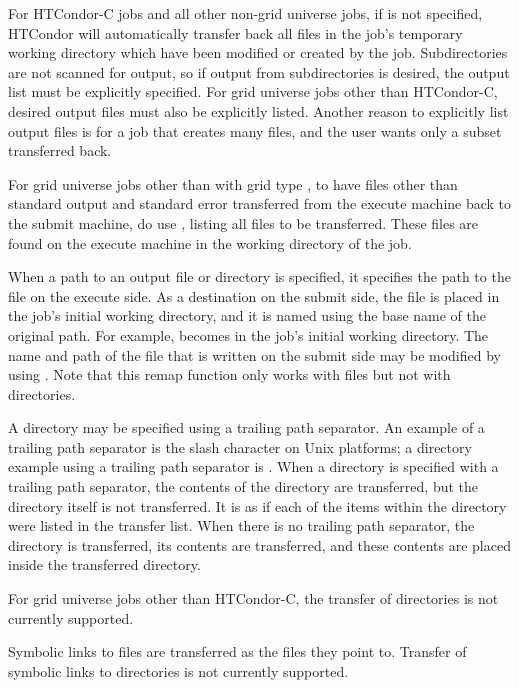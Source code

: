\begin{description}
For HTCondor-C jobs and all other non-grid universe jobs,
if  is not specified,
HTCondor will automatically transfer back all files in the job's
temporary working directory which have been
modified or created by the job.  Subdirectories are not scanned for
output, so if output from subdirectories is desired, the output list
must be explicitly specified.
For grid universe jobs other than HTCondor-C, desired output files must
also be explicitly listed.
Another reason to explicitly list output files is for a job that creates
many files, and the user wants only a subset transferred back.

For grid universe jobs other than with grid type ,
to have files other than standard output and standard error transferred
from the execute machine back to the submit machine,
do use , listing
all files to be transferred.
These files are found on the execute machine in the
working directory of the job.

When a path to an output file or directory is specified,
it specifies the path to the file on the execute side.
As a destination on the submit side,
the file is placed in the job's initial working directory,
and it is named using the base name of the original path.
For example,  becomes  in
the job's initial working directory.
The name and path of the file
that is written on the submit side may be modified by
using . Note that this remap
function only works with files but not with directories. 

A directory may be specified using a trailing path separator.
An example of a trailing path separator is the slash character on Unix
platforms; a directory example using a trailing path separator
is . 
When a directory is specified with a trailing path separator,
the contents of the directory are
transferred,  but the directory itself is not transferred.
It is as if each of the items
within the directory were listed in the transfer list.
When there is no trailing path separator,
the directory is transferred, its contents are transferred,
and these contents are placed inside the transferred directory.

For grid universe jobs other than HTCondor-C, the transfer of
directories is not currently supported.

Symbolic links to files are transferred as the files they point to.
Transfer of symbolic links to directories is not currently supported.


\end{description}
